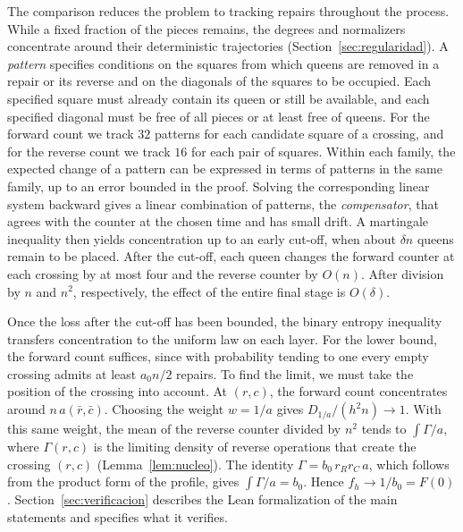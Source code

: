 The comparison reduces the problem to tracking repairs throughout the process. While a fixed fraction of the
pieces remains, the
degrees and normalizers concentrate around their deterministic trajectories (Section~\ref{sec:regularidad}).
A \emph{pattern} specifies
conditions on the squares from which queens are removed in a repair or its reverse and on the diagonals of
the squares to be occupied.
Each specified square must already contain its queen or still be available, and each specified diagonal must
be free of all pieces or
at least free of queens. For the forward count we track $32$ patterns for each candidate square of a
crossing, and for the reverse
count we track $16$ for each pair of squares. Within each family, the expected change of a pattern can be
expressed in terms of
patterns in the same family, up to an error bounded in the proof. Solving the corresponding linear system
backward gives a linear
combination of patterns, the \emph{compensator}, that agrees with the counter at the chosen time and has
small drift. A martingale
inequality then yields concentration up to an early cut-off, when about $\delta n$ queens remain to be
placed. After the cut-off, each
queen changes the forward counter at each crossing by at most four and the reverse counter by $O(n)$. After
division by $n$ and
$n^2$, respectively, the effect of the entire final stage is $O(\delta)$.

Once the loss after the cut-off has been bounded, the binary entropy inequality transfers concentration to
the uniform law on each
layer. For the lower bound, the forward count suffices, since with probability tending to one every empty
crossing admits at least
$a_0n/2$ repairs. To find the limit, we must take the position of the crossing into account. At $(r,c)$, the
forward count concentrates
around $n\,a(\bar r,\bar c)$. Choosing the weight $w=1/a$ gives $D_{1/a}/(h^2n)\to1$. With this same weight,
the mean of the reverse
counter divided by $n^2$ tends to $\int\Gamma/a$, where $\Gamma(r,c)$ is the limiting density of reverse
operations that create the
crossing $(r,c)$ (Lemma~\ref{lem:nucleo}). The identity $\Gamma=b_0\,r_Rr_C\,a$, which follows from the
product form of the profile,
gives $\int\Gamma/a=b_0$. Hence $f_h\to1/b_0=F(0)$. \ifverificacionLean Section~\ref{sec:verificacion}
describes the Lean formalization
of the main statements and specifies what it verifies. \fi

